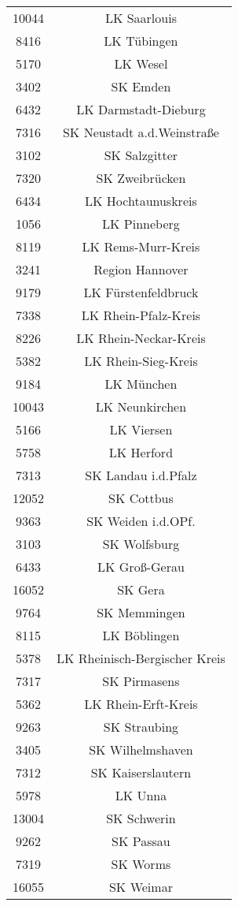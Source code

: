 \begin{tabular}{c c}
    10044&LK Saarlouis\\ 
    8416&LK Tübingen\\ 
    5170&LK Wesel\\ 
    3402&SK Emden\\ 
    6432&LK Darmstadt-Dieburg\\ 
    7316&SK Neustadt a.d.Weinstraße\\ 
    3102&SK Salzgitter\\ 
    7320&SK Zweibrücken\\ 
    6434&LK Hochtaunuskreis\\ 
    1056&LK Pinneberg\\ 
    8119&LK Rems-Murr-Kreis\\ 
    3241&Region Hannover\\ 
    9179&LK Fürstenfeldbruck\\ 
    7338&LK Rhein-Pfalz-Kreis\\ 
    8226&LK Rhein-Neckar-Kreis\\ 
    5382&LK Rhein-Sieg-Kreis\\ 
    9184&LK München\\ 
    10043&LK Neunkirchen\\ 
    5166&LK Viersen\\ 
    5758&LK Herford\\ 
    7313&SK Landau i.d.Pfalz\\ 
    12052&SK Cottbus\\ 
    9363&SK Weiden i.d.OPf.\\ 
    3103&SK Wolfsburg\\ 
    6433&LK Groß-Gerau\\ 
    16052&SK Gera\\ 
    9764&SK Memmingen\\ 
    8115&LK Böblingen\\ 
    5378&LK Rheinisch-Bergischer Kreis\\ 
    7317&SK Pirmasens\\ 
    5362&LK Rhein-Erft-Kreis\\ 
    9263&SK Straubing\\ 
    3405&SK Wilhelmshaven\\ 
    7312&SK Kaiserslautern\\ 
    5978&LK Unna\\ 
    13004&SK Schwerin\\ 
    9262&SK Passau\\ 
    7319&SK Worms\\ 
    16055&SK Weimar\\ 

\end{tabular}
